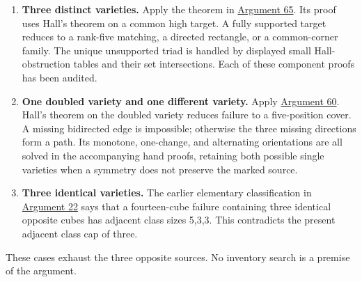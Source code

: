 \documentclass[
  10pt,
]{article}
\begin{document}
\begin{enumerate}
\def\labelenumi{\arabic{enumi}.}
\item
  \textbf{Three distinct varieties.} Apply the theorem in
  \protect\hyperlink{arg-65}{Argument 65}. Its proof uses Hall's theorem
  on a common high target. A fully supported target reduces to a
  rank-five matching, a directed rectangle, or a common-corner family.
  The unique unsupported triad is handled by displayed small
  Hall-obstruction tables and their set intersections. Each of these
  component proofs has been audited.
\item
  \textbf{One doubled variety and one different variety.} Apply
  \protect\hyperlink{arg-60}{Argument 60}. Hall's theorem on the doubled
  variety reduces failure to a five-position cover. A missing bidirected
  edge is impossible; otherwise the three missing directions form a
  path. Its monotone, one-change, and alternating orientations are all
  solved in the accompanying hand proofs, retaining both possible single
  varieties when a symmetry does not preserve the marked source.
\item
  \textbf{Three identical varieties.} The earlier elementary
  classification in \protect\hyperlink{arg-22}{Argument 22} says that a
  fourteen-cube failure containing three identical opposite cubes has
  adjacent class sizes 5,3,3. This contradicts the present adjacent
  class cap of three.
\end{enumerate}

These cases exhaust the three opposite sources. No inventory search is a
premise of the argument.
\end{document}
